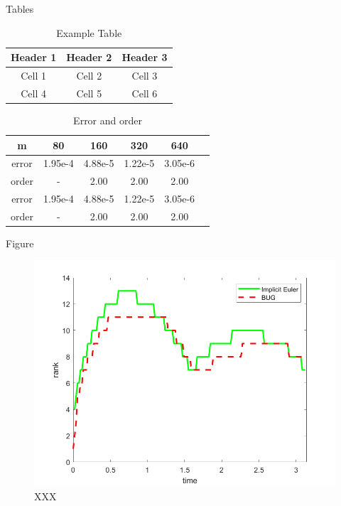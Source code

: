 \documentclass[compress,aspectratio=43]{beamer}
\begin{document}
\begin{frame}{Tables}
    \begin{table}
        \begin{tabular}{|c|c|c|}
            \hline
            Header 1 & Header 2 & Header 3 \\
            \hline
            Cell 1   & Cell 2   & Cell 3   \\
            Cell 4   & Cell 5   & Cell 6   \\
            \hline
        \end{tabular}
        \caption{Example Table}
    \end{table}

    \begin{table}[ht]
        \centering
        \begin{tabular}{c|ccccc}
            \hline
            m     & 80      & 160     & 320     & 640     \\
            \hline
            error & 1.95e-4 & 4.88e-5 & 1.22e-5 & 3.05e-6 \\
            order & -       & 2.00    & 2.00    & 2.00    \\
            \hline
            error & 1.95e-4 & 4.88e-5 & 1.22e-5 & 3.05e-6 \\
            order & -       & 2.00    & 2.00    & 2.00    \\
            \hline
        \end{tabular}
        \caption{Error and order}\label{tab:1}
    \end{table}
\end{frame}

\begin{frame}{Figure}
    \begin{figure}
        \includegraphics[width=0.75\linewidth]{rank-time.png}
        \caption{XXX}
    \end{figure}
\end{frame}
\end{document}
